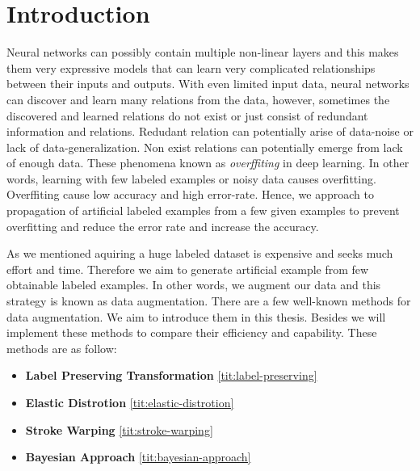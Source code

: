 \chapter{Introduction}

Neural networks can possibly contain multiple non-linear layers and this makes them very expressive models
that can learn very complicated relationships between their inputs and outputs. With even limited
input data, neural networks can discover and learn many relations from the data, however, sometimes the
discovered and learned relations do not exist or just consist of redundant information and
relations. Redudant relation can potentially arise of data-noise or lack of data-generalization. Non
exist relations can potentially emerge from lack of enough data. These phenomena known as
\textit{overffiting} in deep learning. In other words, learning with few labeled examples or noisy
data causes overfitting. Overffiting cause low accuracy and high error-rate. Hence, we approach to propagation of artificial
labeled examples from a few given examples to prevent overfitting and reduce the error rate and increase
the accuracy.

As we mentioned aquiring a huge labeled dataset is expensive and seeks much effort and time. Therefore we aim to generate artificial example from few obtainable labeled examples. In other words, we
augment our data and this strategy is known as data augmentation. There are a few well-known methods for data augmentation. We aim to introduce them in this thesis.  Besides we will implement these
methods to compare their efficiency and capability. These methods are as follow:
\begin{itemize}
  \item \textbf{Label Preserving Transformation} \ref{tit:label-preserving}
  \item \textbf{Elastic Distrotion} \ref{tit:elastic-distrotion}
  \item \textbf{Stroke Warping} \ref{tit:stroke-warping}
  \item \textbf{Bayesian Approach} \ref{tit:bayesian-approach}
\end{itemize}



